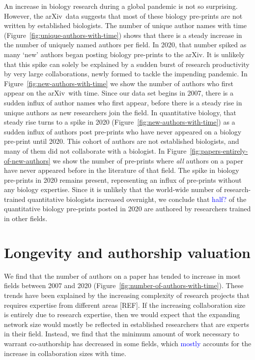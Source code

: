\documentclass{nature}
\newcommand{\todo}[1]{\textcolor{blue}{#1}}
\newcommand{\arxiv}{arXiv}
\begin{document}
An increase in biology research during a global pandemic is not so surprising. However, the \arxiv\ data suggests that most of these biology pre-prints are not written by established biologists. The number of unique author names with time (Figure~\ref{fig:unique-authors-with-time}) shows that there is a steady increase in the number of uniquely named authors per field. In 2020, that number spiked as many `new' authors began posting biology pre-prints to the \arxiv. It is unlikely that this spike can solely be explained by a sudden burst of research productivity by very large collaborations, newly formed to tackle the impending pandemic. In Figure~\ref{fig:new-authors-with-time} we show the number of authors who first appear on the \arxiv\ with time. Since our data set begins in 2007, there is a sudden influx of author names who first appear, before there is a steady rise in unique authors as new researchers join the field. In quantitative biology, that steady rise turns to a spike in 2020 (Figure~\ref{fig:new-authors-with-time}) as a sudden influx of authors post pre-prints who have never appeared on a biology pre-print until 2020.  This cohort of authors are not established biologists, and many of them did not collaborate with a biologist. In Figure~\ref{fig:papers-entirely-of-new-authors} we show the number of pre-prints where \emph{all} authors on a paper have never appeared before in the literature of that field. The spike in biology pre-prints in 2020 remains present, representing an influx of pre-prints without any biology expertise. Since it is unlikely that the world-wide number of research-trained quantitative biologists increased overnight, we conclude that \todo{half?} of the quantitative biology pre-prints posted in 2020 are authored by researchers trained in other fields.


\section*{Longevity and authorship valuation}


We find that the number of authors on a paper has tended to increase in most fields between 2007 and 2020 (Figure~\ref{fig:number-of-authors-with-time}). These trends have been explained by the increasing complexity of research projects that requires expertise from different areas [REF]. If the increasing collaboration size is entirely due to research expertise, then we would expect that the expanding network size would mostly be reflected in established researchers that are experts in their field. Instead, we find that the minimum amount of work necessary to warrant co-authorship has decreased in some fields, which \todo{mostly} accounts for the increase in collaboration sizes with time.
\end{document}

